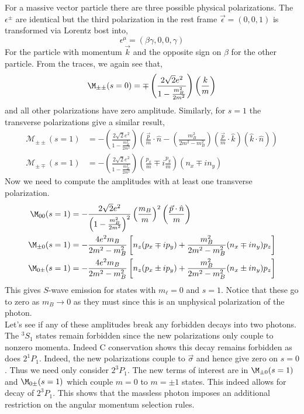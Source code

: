 \documentclass[12pt]{article}
\newcommand{\cM}{\mathcal{M}}
\begin{document}
For a massive vector particle there are three possible physical polarizations. The $\epsilon^{\pm}$ are identical but the third polarization in the rest frame $\vec{\epsilon} = (0,0,1)$ is transformed via Lorentz bost into,
\[ \epsilon^\mu = (\beta \gamma, 0, 0, \gamma) \]
For the particle with momentum $\vec{k}$ and the opposite sign on $\beta$ for the other particle. From the traces, we again see that,
\[ \M_{\pm \pm}(s = 0) = \mp \left( \frac{2 \sqrt{2} e^2}{1 - \frac{m_B^2}{2 m^2}} \right) \left( \frac{k}{m} \right)
\]
and all other polarizations have zero amplitude. Similarly, for $s = 1$ the transverse polarizations give a similar result,
\begin{align*}
\cM_{\pm \pm}(s = 1) &= - \left( \frac{2 \sqrt{2} e^2}{1 - \frac{m_B^2}{2 m^2}} \right) \left( \tfrac{\vec{p}}{m} \cdot \hat{n} - \left( \tfrac{m_B^2}{2 m^2 - m_B^2}\right) (\tfrac{\vec{p}}{m} \cdot \hat{k}) (\hat{k} \cdot \hat{n}) \right)
\\
\cM_{\pm \mp}(s = 1) &= - \left( \frac{2 \sqrt{2} e^2}{1 - \frac{m_B^2}{2 m^2}} \right) (\tfrac{p_x}{m} \mp i \tfrac{p_y}{m})(n_x \mp i n_y)
\end{align*}
Now we need to compute the amplitudes with at least one transverse polarization. 
\begin{align*}
\M_{00}(s = 1) & = - \frac{2 \sqrt{2} e^2}{\left( 1 - \frac{m_B^2}{2m^2} \right)^2} \left( \frac{m_B}{m} \right)^2 \left( \frac{\vec{p} \cdot \hat{n}}{m} \right)
\\
\M_{\pm 0}(s = 1) & = - \frac{4 e^2 m_B}{2 m^2 - m_B^2} \left[ n_z (p_x \mp i p_y) + \frac{m_B^2}{2 m^2 - m_B^2} (n_x \mp i n_y) p_z  \right]
\\
\M_{0\pm}(s = 1) & = - \frac{4 e^2 m_B}{2 m^2 - m_B^2} \left[ n_z (p_x \pm i p_y) + \frac{m_B^2}{2 m^2 - m_B^2} (n_x \pm i n_y) p_z  \right]
\end{align*}
This gives $S$-wave emission for states with $m_\ell = 0$ and $s = 1$.
Notice that these go to zero as $m_B \to 0$ as they must since this is an unphysical polarization of the photon. 
\bigskip\\
Let's see if any of these amplitudes break any forbidden decays into two photons. The ${}^3 S_1$ states remain forbidden since the new polarizations only couple to nonzero momenta. Indeed C conservation shows this decay remains forbidden as does $2^1 P_1$. Indeed, the new polarizations couple to $\vec{\sigma}$ and hence give zero on $s = 0$. Thus we need only consider $2^3 P_1$. The new terms of interest are in $\M_{\pm 0}(s = 1)$ and $\M_{0 \pm}(s = 1)$ which couple $m = 0$ to $m = \pm 1$ states. This indeed allows for decay of $2^3 P_1$. This shows that the massless photon imposes an additional restriction on the angular momentum selection rules. 
\end{document}
